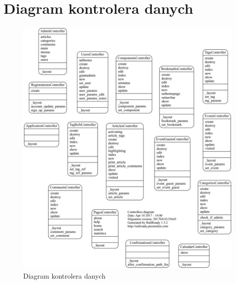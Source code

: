 \documentclass[openright]{xmgr}
\begin{document}
\section{Diagram kontrolera danych}
\begin{figure}[!tbh]
\centering
\includegraphics[width=.9\linewidth]{fig/controllers}
\caption{Diagram kontrolera danych\label{RYS.2}}
\end{figure}

\newpage
\end{document}
